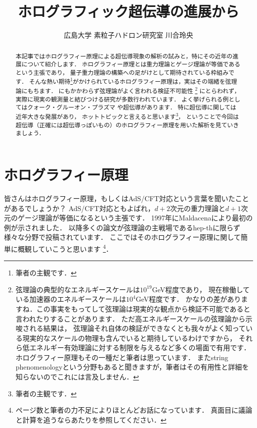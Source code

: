 \documentclass[b5paper,11pt,dvipdfmx]{jsarticle}
\numberwithin{equation}{section}
\theoremstyle{definition}
\begin{document}
\title{ホログラフィック超伝導の進展から}
\author{広島大学 素粒子ハドロン研究室 川合玲央}
\date{}

\maketitle


\begin{abstract}
    本記事ではホログラフィー原理による超伝導現象の解析の試みと，特にその近年の進展について紹介します．
    ホログラフィー原理とは重力理論とゲージ理論が等価であるという主張であり，
    量子重力理論の構築への足がけとして期待されている枠組みです．
    そんな熱い期待\footnote{筆者の主観です．}がかけられているホログラフィー原理は，実はその端緒を弦理論にもちます．
    にもかかわらず弦理論がよく言われる検証不可能性
    \footnote{弦理論の典型的なエネルギースケールは$10^{19}$GeV程度であり，
    現在稼働している加速器のエネルギースケールは$10^4$GeV程度です．
    かなりの差がありますね．この事実をもってして弦理論は現実的な観点から検証不可能であると言われたりすることがあります．
    ただ高エネルギースケールの弦理論から示唆される結果は，
    弦理論それ自体の検証ができなくとも我々がよく知っている現実的なスケールの物理も含んでいると期待しているわけですから，
    それら低エネルギー有効理論に対する制限を与えるなど多くの場面で有用です．
    ホログラフィー原理もその一種だと筆者は思っています．
    またstring phenomenologyという分野もあると聞きますが，筆者はその有用性と詳細を知らないのでこれには言及しません．}
    にとらわれず，実際に現実の観測量と結びつける研究が多数行われています．
    よく挙げられる例としてはクォーク・グルーオン・プラズマ\cite{Policastro01,Kovtun04}
    や超伝導\cite{Hartnoll08a,Hartnoll08b}があります．
    特に超伝導に関しては近年大きな発展があり，
    ホットトピックと言えると思います\footnote{筆者の主観です．}，
    ということで今回は超伝導（正確には超伝導っぽいもの）のホログラフィー原理を用いた解析を見ていきましょう．
\end{abstract}


\section{ホログラフィー原理}
皆さんはホログラフィー原理，もしくはAdS/CFT対応という言葉を聞いたことがあるでしょうか？
AdS/CFT対応ともよばれ，$d + 2$次元の重力理論と$d + 1$次元のゲージ理論が等価になるという主張です．
1997年にMaldacenaにより最初の例が示されました\cite{Maldacena97}．
以降多くの論文が弦理論の主戦場であるhep-thに限らず様々な分野で投稿されています．
ここではそのホログラフィー原理に関して簡単に概観していこうと思います
\footnote{ページ数と筆者の力不足によりほとんどお話になっています．
真面目に議論と計算を追うなら\cite{Witten98,Aharony99,Bousso02,Ammon15}あたりを参照してください．}．
\end{document}
